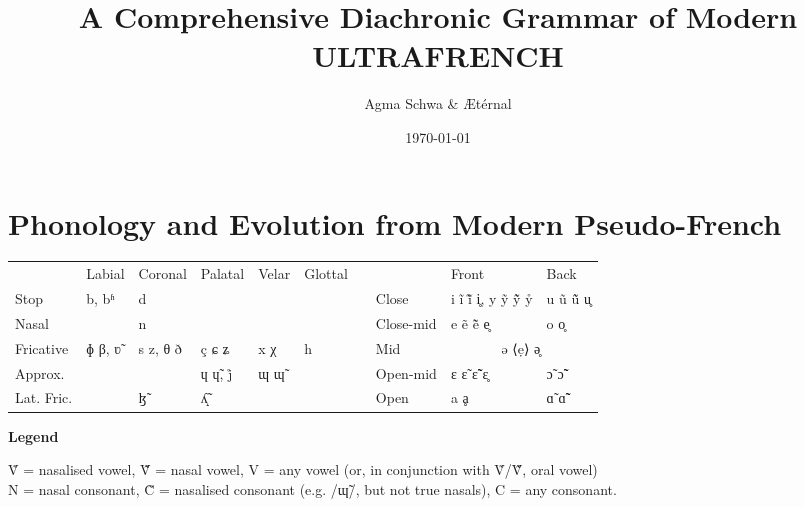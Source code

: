 \documentclass[a4paper, 12pt, oneside, final]{article}
\title{A Comprehensive Diachronic Grammar of Modern ULTRAFRENCH}
\author{Agma Schwa \& Ætérnal}
\date{\today}
\def\parheading#1{\noindent\textbf{#1}}
\let\Sub\textsubscript
\begin{document}
\maketitle
\thispagestyle{empty}
\clearpage
\setcounter{page}{1}

\tableofcontents
\clearpage

\section{Phonology and Evolution from Modern Pseudo-French}\label{sec:phonology}{\def\arraystretch{1.25}\setlength{\tabcolsep}{.4em}
\noindent\begin{tabular}{@{}|l|l|l|l|l|l|l@{\quad}|l|l|l|}                                                   \cline{1-6} \cline{8-10}
               & Labial & Coronal  & Palatal  & Velar & Glottal &&           & Front        & Back        \\ \cline{1-6} \cline{8-10}
    Stop       & b, bʱ  & d        &          &       &         && Close     & i ĩ ĩ̃ i̥, y ỹ ỹ̃ ẙ & u ũ ũ̃ u̥ \\ \cline{1-6} \cline{8-10}
    Nasal      &        & n        &          &       &         && Close-mid & e ẽ ẽ̃ e̥      & o o̥         \\ \cline{1-6} \cline{8-10}
    Fricative  & ɸ β, ʋ̃ & s z, θ ð & ç ɕ ʑ    & x χ   & h       && Mid       & \multicolumn{2}{c|}{ə ⟨ẹ⟩ ə̥}   \\ \cline{1-6} \cline{8-10}
    Approx.    &        &          & ɥ ɥ̃, j̊   & ɰ ɰ̃   &         && Open-mid  & ɛ ɛ̃ ɛ̃̃ ɛ̥      & ɔ̃ ɔ̃̃         \\ \cline{1-6} \cline{8-10}
    Lat. Fric. &        & ɮ̃        & ʎ̝̃        &       &         && Open      & a ḁ          & ɑ̃ ɑ̃̃         \\ \cline{1-6} \cline{8-10}
\end{tabular}}\bigskip

\parheading{Legend}\par\noindent
Ṽ = nasalised vowel, Ṽ̃ = nasal vowel, V = any vowel (or, in conjunction with Ṽ/Ṽ̃, oral vowel)\\
N = nasal consonant, C̃ = nasalised consonant (e.g. /ɰ̃/, but not true nasals), C = any consonant.\medskip
\def\scalpha{\kern-2pt\raisebox{2pt}{\Sub α}}

\end{document}
